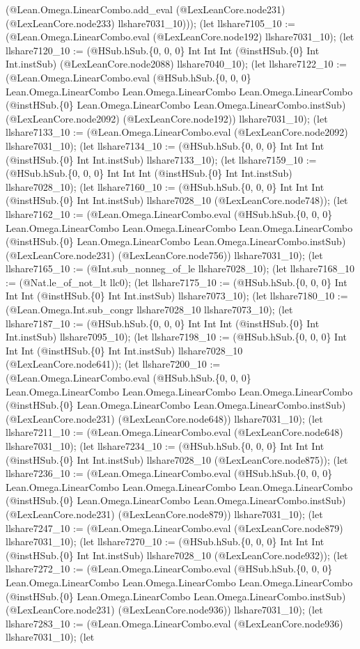 \documentclass[11pt]{article}
\begin{document}
(@Lean.Omega.LinearCombo.add\_eval (@LexLeanCore.node231) (@LexLeanCore.node233) llshare7031\_10))); (let llshare7105\_10 := (@Lean.Omega.LinearCombo.eval (@LexLeanCore.node192) llshare7031\_10); (let llshare7120\_10 := (@HSub.hSub.\{0, 0, 0\} Int Int Int (@instHSub.\{0\} Int Int.instSub) (@LexLeanCore.node2088) llshare7040\_10); (let llshare7122\_10 := (@Lean.Omega.LinearCombo.eval (@HSub.hSub.\{0, 0, 0\} Lean.Omega.LinearCombo Lean.Omega.LinearCombo Lean.Omega.LinearCombo (@instHSub.\{0\} Lean.Omega.LinearCombo Lean.Omega.LinearCombo.instSub) (@LexLeanCore.node2092) (@LexLeanCore.node192)) llshare7031\_10); (let llshare7133\_10 := (@Lean.Omega.LinearCombo.eval (@LexLeanCore.node2092) llshare7031\_10); (let llshare7134\_10 := (@HSub.hSub.\{0, 0, 0\} Int Int Int (@instHSub.\{0\} Int Int.instSub) llshare7133\_10); (let llshare7159\_10 := (@HSub.hSub.\{0, 0, 0\} Int Int Int (@instHSub.\{0\} Int Int.instSub) llshare7028\_10); (let llshare7160\_10 := (@HSub.hSub.\{0, 0, 0\} Int Int Int (@instHSub.\{0\} Int Int.instSub) llshare7028\_10 (@LexLeanCore.node748)); (let llshare7162\_10 := (@Lean.Omega.LinearCombo.eval (@HSub.hSub.\{0, 0, 0\} Lean.Omega.LinearCombo Lean.Omega.LinearCombo Lean.Omega.LinearCombo (@instHSub.\{0\} Lean.Omega.LinearCombo Lean.Omega.LinearCombo.instSub) (@LexLeanCore.node231) (@LexLeanCore.node756)) llshare7031\_10); (let llshare7165\_10 := (@Int.sub\_nonneg\_of\_le llshare7028\_10); (let llshare7168\_10 := (@Nat.le\_of\_not\_lt llc0); (let llshare7175\_10 := (@HSub.hSub.\{0, 0, 0\} Int Int Int (@instHSub.\{0\} Int Int.instSub) llshare7073\_10); (let llshare7180\_10 := (@Lean.Omega.Int.sub\_congr llshare7028\_10 llshare7073\_10); (let llshare7187\_10 := (@HSub.hSub.\{0, 0, 0\} Int Int Int (@instHSub.\{0\} Int Int.instSub) llshare7095\_10); (let llshare7198\_10 := (@HSub.hSub.\{0, 0, 0\} Int Int Int (@instHSub.\{0\} Int Int.instSub) llshare7028\_10 (@LexLeanCore.node641)); (let llshare7200\_10 := (@Lean.Omega.LinearCombo.eval (@HSub.hSub.\{0, 0, 0\} Lean.Omega.LinearCombo Lean.Omega.LinearCombo Lean.Omega.LinearCombo (@instHSub.\{0\} Lean.Omega.LinearCombo Lean.Omega.LinearCombo.instSub) (@LexLeanCore.node231) (@LexLeanCore.node648)) llshare7031\_10); (let llshare7211\_10 := (@Lean.Omega.LinearCombo.eval (@LexLeanCore.node648) llshare7031\_10); (let llshare7234\_10 := (@HSub.hSub.\{0, 0, 0\} Int Int Int (@instHSub.\{0\} Int Int.instSub) llshare7028\_10 (@LexLeanCore.node875)); (let llshare7236\_10 := (@Lean.Omega.LinearCombo.eval (@HSub.hSub.\{0, 0, 0\} Lean.Omega.LinearCombo Lean.Omega.LinearCombo Lean.Omega.LinearCombo (@instHSub.\{0\} Lean.Omega.LinearCombo Lean.Omega.LinearCombo.instSub) (@LexLeanCore.node231) (@LexLeanCore.node879)) llshare7031\_10); (let llshare7247\_10 := (@Lean.Omega.LinearCombo.eval (@LexLeanCore.node879) llshare7031\_10); (let llshare7270\_10 := (@HSub.hSub.\{0, 0, 0\} Int Int Int (@instHSub.\{0\} Int Int.instSub) llshare7028\_10 (@LexLeanCore.node932)); (let llshare7272\_10 := (@Lean.Omega.LinearCombo.eval (@HSub.hSub.\{0, 0, 0\} Lean.Omega.LinearCombo Lean.Omega.LinearCombo Lean.Omega.LinearCombo (@instHSub.\{0\} Lean.Omega.LinearCombo Lean.Omega.LinearCombo.instSub) (@LexLeanCore.node231) (@LexLeanCore.node936)) llshare7031\_10); (let llshare7283\_10 := (@Lean.Omega.LinearCombo.eval (@LexLeanCore.node936) llshare7031\_10); (let 
\end{document}
